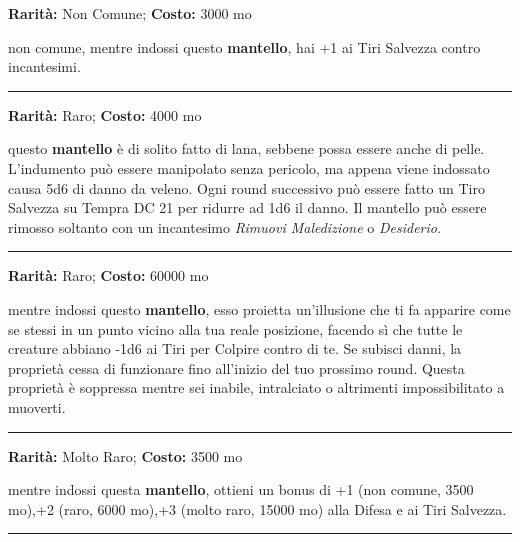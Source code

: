 \begin{multicols}{2}
\textbf{Rarità:} Non Comune; \textbf{Costo:} 3000 mo

non comune, mentre indossi questo \textbf{mantello}, hai +1 ai Tiri Salvezza contro incantesimi.

\smallskip\noindent\rule{\linewidth}{2pt}  \hypertarget{Mantellodellavelenosità}{}\medskip{}\noindent\label{Mantellodellavelenosità}

\textbf{Rarità:} Raro; \textbf{Costo:} 4000 mo

questo \textbf{mantello} è di solito fatto di lana, sebbene possa essere anche di pelle. L'indumento può essere manipolato senza pericolo, ma appena viene indossato causa 5d6 di danno da veleno. Ogni round successivo può essere fatto un Tiro Salvezza su Tempra DC 21 per ridurre ad 1d6 il danno. Il mantello può essere rimosso soltanto con un incantesimo \emph{Rimuovi Maledizione} o \emph{Desiderio}.

\smallskip\noindent\rule{\linewidth}{2pt}  \hypertarget{MantellodiDistorsione}{}\medskip{}\noindent\label{MantellodiDistorsione}

\textbf{Rarità:} Raro; \textbf{Costo:} 60000 mo

mentre indossi questo \textbf{mantello}, esso proietta un'illusione che ti fa apparire come se stessi in un punto vicino alla tua reale posizione, facendo sì che tutte le creature abbiano -1d6 ai Tiri per Colpire contro di te. Se subisci danni, la proprietà cessa di funzionare fino all'inizio del tuo prossimo round. Questa proprietà è soppressa mentre sei inabile, intralciato o altrimenti impossibilitato a muoverti.

\smallskip\noindent\rule{\linewidth}{2pt}  \hypertarget{MantellodiProtezione}{}\medskip{}\noindent\label{MantellodiProtezione}

\textbf{Rarità:} Molto Raro; \textbf{Costo:} 3500 mo

mentre indossi questa \textbf{mantello}, ottieni un bonus di +1 (non comune, 3500 mo),+2 (raro, 6000 mo),+3 (molto raro, 15000 mo) alla Difesa e ai Tiri Salvezza.

\smallskip\noindent\rule{\linewidth}{2pt}  \hypertarget{ManualedeiGolem}{}\medskip{}\noindent\label{ManualedeiGolem}


\end{multicols}
